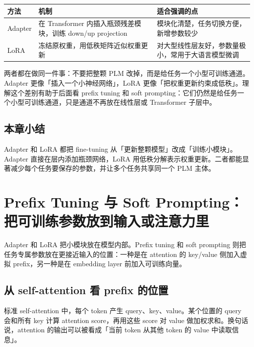 \documentclass[a4paper]{article}
\begin{document}
\begin{center}
\begin{tabular}{L{2.9cm} L{5.1cm} L{5.1cm}}
\toprule
方法 & 机制 & 适合强调的点 \\
\midrule
Adapter & 在 Transformer 内插入瓶颈残差模块，训练 down/up projection & 模块化清楚，任务切换方便，新增参数较少 \\
LoRA & 冻结原权重，用低秩矩阵近似权重更新 & 对大型线性层友好，参数量极小，常用于大语言模型微调 \\
\bottomrule
\end{tabular}
\end{center}

两者都在做同一件事：不要把整颗 PLM 改掉，而是给任务一个小型可训练通道。Adapter 更像「插入一个小神经网络」，LoRA 更像「把权重更新约束成低秩」。理解这个差别有助于后面看 prefix tuning 和 soft prompting：它们仍然是给任务一个小型可训练通道，只是通道不再放在线性层或 Transformer 子层中。

\subsection{本章小结}

Adapter 和 LoRA 都把 fine-tuning 从「更新整颗模型」改成「训练小模块」。Adapter 直接在层内添加瓶颈网络，LoRA 用低秩分解表示权重更新。二者都能显著减少每个任务要保存的参数，并让多个任务共享同一个 PLM 主体。

\section{Prefix Tuning 与 Soft Prompting：把可训练参数放到输入或注意力里}

Adapter 和 LoRA 把小模块放在模型内部。Prefix tuning 和 soft prompting 则把任务专属参数放在更接近输入的位置：一种是在 attention 的 key/value 侧加入虚拟 prefix，另一种是在 embedding layer 前加入可训练向量。

\subsection{从 self-attention 看 prefix 的位置}

标准 self-attention 中，每个 token 产生 query、key、value。某个位置的 query 会和所有 key 计算 attention score，再用这些 score 对 value 做加权求和。换句话说，attention 的输出可以被看成「当前 token 从其他 token 的 value 中读取信息」。
\end{document}
